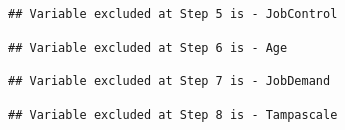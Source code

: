 \documentclass[
]{book}
\newenvironment{Shaded}{\begin{snugshade}}{\end{snugshade}}
\newcommand{\NormalTok}[1]{#1}
\newcommand{\OperatorTok}[1]{\textcolor[rgb]{0.81,0.36,0.00}{\textbf{#1}}}
\begin{document}
\begin{verbatim}
## Variable excluded at Step 5 is - JobControl
\end{verbatim}

\begin{verbatim}
## Variable excluded at Step 6 is - Age
\end{verbatim}

\begin{verbatim}
## Variable excluded at Step 7 is - JobDemand
\end{verbatim}

\begin{verbatim}
## Variable excluded at Step 8 is - Tampascale
\end{verbatim}

\begin{Shaded}
\end{Shaded}
\end{document}
